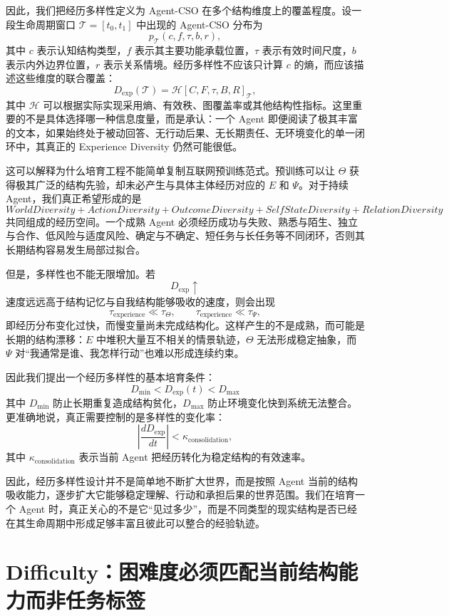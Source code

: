 因此，我们把经历多样性定义为 Agent-CSO 在多个结构维度上的覆盖程度。设一段生命周期窗口 $\mathcal T=[t_0,t_1]$ 中出现的 Agent-CSO 分布为
\[
p_{\mathcal T}(c,f,\tau,b,r),
\]
其中 $c$ 表示认知结构类型，$f$ 表示其主要功能承载位置，$\tau$ 表示有效时间尺度，$b$ 表示内外边界位置，$r$ 表示关系情境。经历多样性不应该只计算 $c$ 的熵，而应该描述这些维度的联合覆盖：
\[
D_{\mathrm{exp}}(\mathcal T)
=
\mathcal H
\left[
C,F,\tau,B,R
\right]_{\mathcal T},
\]
其中 $\mathcal H$ 可以根据实际实现采用熵、有效秩、图覆盖率或其他结构性指标。这里重要的不是具体选择哪一种信息度量，而是承认：一个 Agent 即便阅读了极其丰富的文本，如果始终处于被动回答、无行动后果、无长期责任、无环境变化的单一闭环中，其真正的 Experience Diversity 仍然可能很低。

这可以解释为什么培育工程不能简单复制互联网预训练范式。预训练可以让 $\Theta$ 获得极其广泛的结构先验，却未必产生与具体主体经历对应的 $E$ 和 $\Psi$。对于持续 Agent，我们真正希望形成的是
\[
\boxed{
WorldDiversity
+
ActionDiversity
+
OutcomeDiversity
+
SelfStateDiversity
+
RelationDiversity
}
\]
共同组成的经历空间。一个成熟 Agent 必须经历成功与失败、熟悉与陌生、独立与合作、低风险与适度风险、确定与不确定、短任务与长任务等不同闭环，否则其长期结构容易发生局部过拟合。

但是，多样性也不能无限增加。若
\[
D_{\mathrm{exp}}\uparrow
\]
速度远远高于结构记忆与自我结构能够吸收的速度，则会出现
\[
\tau_{\mathrm{experience}}
\ll
\tau_{\Theta},
\qquad
\tau_{\mathrm{experience}}
\ll
\tau_{\Psi},
\]
即经历分布变化过快，而慢变量尚未完成结构化。这样产生的不是成熟，而可能是长期的结构漂移：$E$ 中堆积大量互不相关的情景轨迹，$\Theta$ 无法形成稳定抽象，而 $\Psi$ 对“我通常是谁、我怎样行动”也难以形成连续约束。

因此我们提出一个经历多样性的基本培育条件：
\[
\boxed{
D_{\min}
<
D_{\mathrm{exp}}(t)
<
D_{\max}
}
\]
其中 $D_{\min}$ 防止长期重复造成结构贫化，$D_{\max}$ 防止环境变化快到系统无法整合。更准确地说，真正需要控制的是多样性的变化率：
\[
\left|
\frac{dD_{\mathrm{exp}}}{dt}
\right|
<
\kappa_{\mathrm{consolidation}},
\]
其中 $\kappa_{\mathrm{consolidation}}$ 表示当前 Agent 把经历转化为稳定结构的有效速率。

因此，经历多样性设计并不是简单地不断扩大世界，而是按照 Agent 当前的结构吸收能力，逐步扩大它能够稳定理解、行动和承担后果的世界范围。我们在培育一个 Agent 时，真正关心的不是它“见过多少”，而是不同类型的现实结构是否已经在其生命周期中形成足够丰富且彼此可以整合的经验轨迹。

\section{Difficulty：困难度必须匹配当前结构能力而非任务标签}

